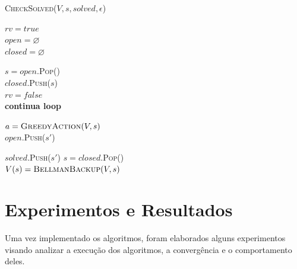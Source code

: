 \documentclass[letterpaper]{article}
\begin{document}
\linesnumbered
\begin{algorithm}[t]
{
	\caption{\textsc{CheckSolved}($ V, s, \textit{solved}, \epsilon $) }
	\label{alg:checksolved}
    $ \textit{rv} = true $\\
    $ \textit{open} = \varnothing $\\
    $ \textit{closed} = \varnothing $\\

    {
        $s = \textit{open}$.\textsc{Pop}() \\
        $\textit{closed}$.\textsc{Push}($s$) \\

        {
            $ \textit{rv} = false $\\
            \textbf{continua loop}
        }

        $a = \textsc{GreedyAction}(V, s)$ \\

        {
            {
                $\textit{open}$.\textsc{Push}($s'$)
            }
        }
    }

    {
        {
            $\textit{solved}$.\textsc{Push}($s'$)
        }
    }
    {
        {
            $ s = \textit{closed}$.\textsc{Pop}()\\
            $V(s) = \textsc{BellmanBackup}(V, s)$ \\
        }
    }

}
\end{algorithm}



\section{Experimentos e Resultados}

Uma vez implementado os algoritmos, foram elaborados alguns experimentos visando analizar a execução dos algoritmos, a convergência e o comportamento deles.
\end{document}

